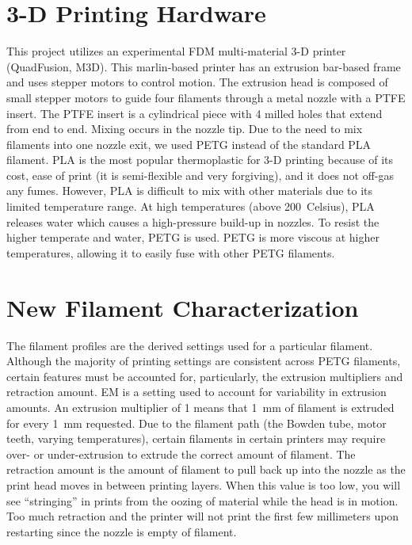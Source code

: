 \section{3-D Printing Hardware}
This project utilizes an experimental \ac{FDM} multi-material 3-D printer (QuadFusion, M3D). This marlin-based printer has an extrusion bar-based frame and uses stepper motors to control motion. The extrusion head is composed of small stepper motors to guide four filaments through a metal nozzle with a \ac{PTFE} insert. The \ac{PTFE} insert is a cylindrical piece with 4 milled holes that extend from end to end. Mixing occurs in the nozzle tip. Due to the need to mix filaments into one nozzle exit, we used \ac{PETG} instead of the standard \ac{PLA} filament. \ac{PLA} is the most popular thermoplastic for 3-D printing because of its cost, ease of print (it is semi-flexible and very forgiving), and it does not off-gas any fumes. However, \ac{PLA} is difficult to mix with other materials due to its limited temperature range. At high temperatures (above 200\textdegree~Celsius), \ac{PLA} releases water which causes a high-pressure build-up in nozzles. To resist the higher temperate and water, \ac{PETG} is used. \ac{PETG} is more viscous at higher temperatures, allowing it to easily fuse with other \ac{PETG} filaments. 


\section{New Filament Characterization}
The filament profiles are the derived settings used for a particular filament. Although the majority of printing settings are consistent across \ac{PETG} filaments, certain features must be accounted for, particularly, the extrusion multipliers and retraction amount. \ac{EM} is a setting used to account for variability in extrusion amounts. An extrusion multiplier of 1 means that 1~mm of filament is extruded for every 1~mm requested. Due to the filament path (the Bowden tube, motor teeth, varying temperatures), certain filaments in certain printers may require over- or under-extrusion to extrude the correct amount of filament. The retraction amount is the amount of filament to pull back up into the nozzle as the print head moves in between printing layers. When this value is too low, you will see ``stringing'' in prints from the oozing of material while the head is in motion. Too much retraction and the printer will not print the first few millimeters upon restarting since the nozzle is empty of filament.

